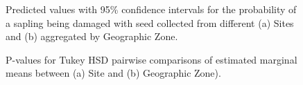 \documentclass[a4paper, 11pt]{article}
\begin{document}
\begin{figure}[H]
\centering
	\caption{Predicted values with 95\% confidence intervals for the probability of a sapling being damaged with seed collected from different (a) Sites and (b) aggregated by Geographic Zone.}
	\label{pred_binom}
\end{figure}

\begin{figure}[H]
\centering
	\caption{P-values for Tukey HSD pairwise comparisons of estimated marginal means between (a) Site and (b) Geographic Zone).}
	\label{binom_margin}
\end{figure}
\end{document}
